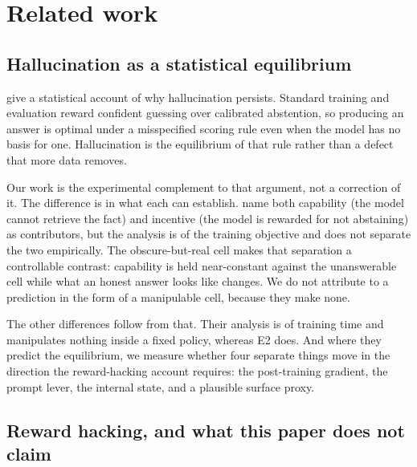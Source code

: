 
\section{Related work}

\subsection{Hallucination as a statistical equilibrium}

\citet{kalai2025} give a statistical account of why hallucination persists.
Standard training and evaluation reward confident guessing over calibrated
abstention, so producing an answer is optimal under a misspecified scoring rule
even when the model has no basis for one. Hallucination is the equilibrium of
that rule rather than a defect that more data removes.

Our work is the experimental complement to that argument, not a correction of
it. The difference is in what each can establish. \citet{kalai2025} name both
capability (the model cannot retrieve the fact) and incentive (the model is
rewarded for not abstaining) as contributors, but the analysis is of the
training objective and does not separate the two empirically. The
obscure-but-real cell makes that separation a controllable contrast: capability
is held near-constant against the unanswerable cell while what an honest answer
looks like changes. We do not attribute to \citet{kalai2025} a prediction in the
form of a manipulable cell, because they make none.

The other differences follow from that. Their analysis is of training time and
manipulates nothing inside a fixed policy, whereas E2 does. And where they
predict the equilibrium, we measure whether four separate things move in the
direction the reward-hacking account requires: the post-training gradient, the
prompt lever, the internal state, and a plausible surface proxy.

\subsection{Reward hacking, and what this paper does not claim}

